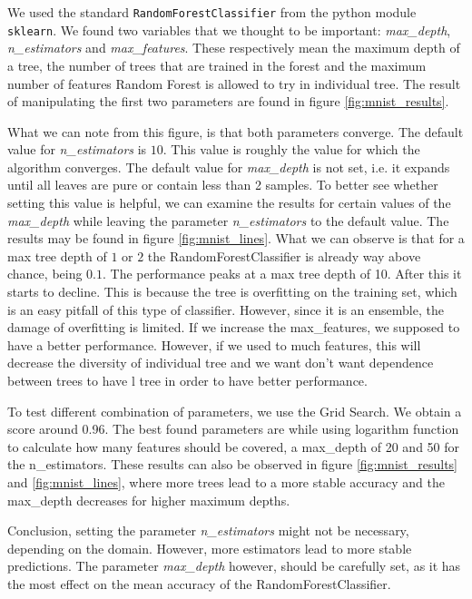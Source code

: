 \documentclass[11pt]{article}
\begin{document}
We used the standard \texttt{RandomForestClassifier} from the python module \texttt{sklearn}. We found two variables that we thought to be important: \textit{max\_depth}, \textit{n\_estimators} and \textit{max\_features}. These respectively mean the maximum depth of a tree, the number of trees that are trained in the forest and the maximum number of features Random Forest is allowed to try in individual tree. The result of manipulating the first two parameters are found in figure \ref{fig:mnist_results}.

What we can note from this figure, is that both parameters converge. The default value for \textit{n\_estimators} is $10$. This value is roughly the value for which the algorithm converges. The default value for \textit{max\_depth} is not set, i.e. it expands until all leaves are pure or contain less than 2 samples. To better see whether setting this value is helpful, we can examine the results for certain values of the \textit{max\_depth} while leaving the parameter \textit{n\_estimators} to the default value. The results may be found in figure \ref{fig:mnist_lines}. What we can observe is that for a max tree depth of $1$ or $2$ the RandomForestClassifier is already way above chance, being $0.1$. The performance peaks at a max tree depth of 10. After this it starts to decline. This is because the tree is overfitting on the training set, which is an easy pitfall of this type of classifier. However, since it is an ensemble, the damage of overfitting is limited.
If we increase the max\_features, we supposed to have a better performance. However, if we used to much features, this will decrease the diversity of individual tree and we want don't want dependence between trees to have l tree in order to have better performance. 

To test different combination of parameters, we use the Grid Search. We obtain a score around 0.96. The best found parameters are while using logarithm function to calculate how many features should be covered, a max\_depth of 20 and 50 for the n\_estimators. These results can also be observed in figure \ref{fig:mnist_results} and \ref{fig:mnist_lines}, where more trees lead to a more stable accuracy and the max\_depth decreases for higher maximum depths.

Conclusion, setting the parameter \textit{n\_estimators} might not be necessary, depending on the domain. However, more estimators lead to more stable predictions. The parameter \textit{max\_depth} however, should be carefully set, as it has the most effect on the mean accuracy of the RandomForestClassifier.
\end{document}
